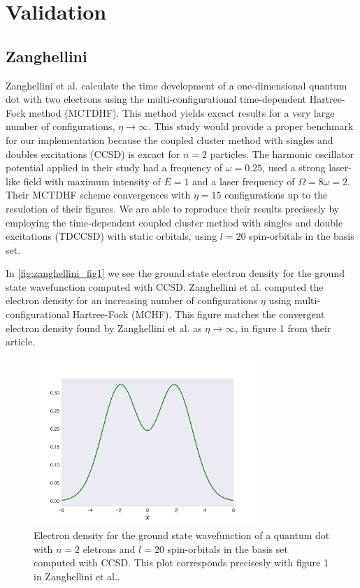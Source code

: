 \chapter{Validation}

\section{Zanghellini}

Zanghellini et al.\cite{Zanghellini04} calculate the time development of a 
one-dimensional quantum dot with two electrons using the multi-configurational 
time-dependent Hartree-Fock method (MCTDHF). This method yields excact results for 
a very large number of configurations, $\eta \to \infty$. This study would provide a 
proper benchmark for our implementation because the coupled cluster method with singles and 
doubles excitations (CCSD) is excact for $n=2$ particles. 
The harmonic oscillator potential applied in
their study had a frequency of $\omega=0.25$, used a strong laser-like field with 
maximum intensity of $E = 1$ and a laser frequency of $\Omega = 8 \omega = 2$.
Their MCTDHF scheme convergences with $\eta=15$
configurations up to the resulotion of their figures.
We are able to reproduce their results precisesly by employing the 
time-dependent coupled cluster method with singles and double excitations (TDCCSD) with 
static orbitals, using $l=20$ spin-orbitals in the basis set.

In \autoref{fig:zanghellini_fig1} we see the ground state electron density for the 
ground state wavefunction computed with CCSD. Zanghellini et al. computed the electron
density for an increasing number of configurations $\eta$ using multi-configurational
Hartree-Fock (MCHF). This figure matches the convergent electron density found by Zanghellini et al. 
as $\eta \to \infty$, in figure 1 from their article. 

\begin{figure}
    \centering
    \includegraphics[width=0.75\textwidth]{results/figures/zanghellini_fig1.png}
    \caption{
        \label{fig:zanghellini_fig1}
        Electron density for the ground state wavefunction of a quantum dot with 
        $n=2$ eletrons and $l=20$ spin-orbitals in the basis set computed with
        CCSD. This plot 
        corresponds precisesly with figure 1 in Zanghellini et al.\cite{Zanghellini04}.
    }
\end{figure}

